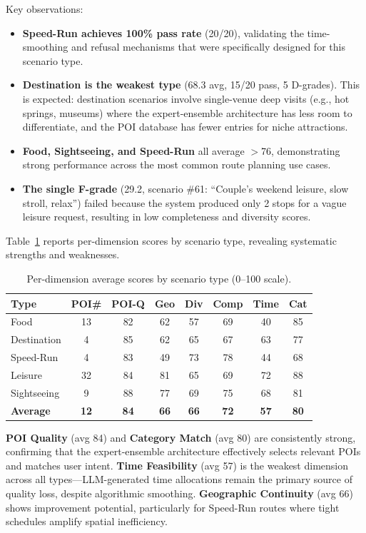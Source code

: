 Key observations:
\begin{itemize}[leftmargin=*]
    \item \textbf{Speed-Run achieves 100\% pass rate} (20/20), validating the time-smoothing and refusal mechanisms that were specifically designed for this scenario type.
    \item \textbf{Destination is the weakest type} (68.3 avg, 15/20 pass, 5 D-grades). This is expected: destination scenarios involve single-venue deep visits (e.g., hot springs, museums) where the expert-ensemble architecture has less room to differentiate, and the POI database has fewer entries for niche attractions.
    \item \textbf{Food, Sightseeing, and Speed-Run} all average $>$76, demonstrating strong performance across the most common route planning use cases.
    \item \textbf{The single F-grade} (29.2, scenario \#61: ``Couple's weekend leisure, slow stroll, relax'') failed because the system produced only 2 stops for a vague leisure request, resulting in low completeness and diversity scores.
\end{itemize}

Table~\ref{tab:100_dims} reports per-dimension scores by scenario type, revealing systematic strengths and weaknesses.

\begin{table}[H]
\centering
\caption{Per-dimension average scores by scenario type (0--100 scale).}
\label{tab:100_dims}
\begin{tabular}{@{}lccccccc@{}}
\toprule
\textbf{Type} & \textbf{POI\#} & \textbf{POI-Q} & \textbf{Geo} & \textbf{Div} & \textbf{Comp} & \textbf{Time} & \textbf{Cat} \\
\midrule
Food & 13 & 82 & 62 & 57 & 69 & 40 & 85 \\
Destination & 4 & 85 & 62 & 65 & 67 & 63 & 77 \\
Speed-Run & 4 & 83 & 49 & 73 & 78 & 44 & 68 \\
Leisure & 32 & 84 & 81 & 65 & 69 & 72 & 88 \\
Sightseeing & 9 & 88 & 77 & 69 & 75 & 68 & 81 \\
\midrule
\textbf{Average} & \textbf{12} & \textbf{84} & \textbf{66} & \textbf{66} & \textbf{72} & \textbf{57} & \textbf{80} \\
\bottomrule
\end{tabular}
\end{table}

\textbf{POI Quality} (avg 84) and \textbf{Category Match} (avg 80) are consistently strong, confirming that the expert-ensemble architecture effectively selects relevant POIs and matches user intent. \textbf{Time Feasibility} (avg 57) is the weakest dimension across all types---LLM-generated time allocations remain the primary source of quality loss, despite algorithmic smoothing. \textbf{Geographic Continuity} (avg 66) shows improvement potential, particularly for Speed-Run routes where tight schedules amplify spatial inefficiency.

